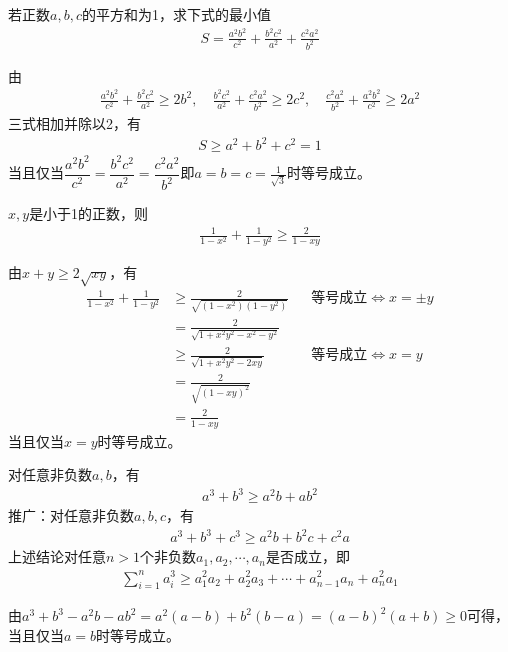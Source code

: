 \begin{example}
  若正数$a,b,c$的平方和为1，求下式的最小值
  \begin{align*}
    S=\frac{a^2b^2}{c^2} + \frac{b^2c^2}{a^2} + \frac{c^2a^2}{b^2}
  \end{align*}
\end{example}

由
\begin{align*}
  \frac{a^2b^2}{c^2} + \frac{b^2c^2}{a^2}\ge 2b^2,\quad
  \frac{b^2c^2}{a^2} + \frac{c^2a^2}{b^2}\ge 2c^2,\quad
  \frac{c^2a^2}{b^2} + \frac{a^2b^2}{c^2}\ge 2a^2
\end{align*}
三式相加并除以2，有
\begin{align*}
  S\ge a^2+b^2+c^2=1
\end{align*}
当且仅当$\dfrac{a^2b^2}{c^2} = \dfrac{b^2c^2}{a^2} = \dfrac{c^2a^2}{b^2}$即$a=b=c=\frac1{\sqrt3}$时等号成立。


\begin{example}
  $x,y$是小于1的正数，则
  \begin{align*}
    \frac1{1-x^2} + \frac1{1-y^2} \ge \frac2{1-xy}
  \end{align*}
\end{example}
由$x+y\ge2\sqrt{xy}$，有
\begin{align*}
  \frac1{1-x^2} + \frac1{1-y^2} &\ge \frac2{\sqrt{(1-x^2)(1-y^2)}} &&\text{等号成立}\iff x=\pm y\\
  &=\frac2{\sqrt{1+x^2y^2-x^2-y^2}} \\
  &\ge \frac2{\sqrt{1+x^2y^2-2xy}} &&\text{等号成立}\iff x=y\\
  &=\frac2{\sqrt{(1-xy)^2}} \\
  &=\frac2{1-xy}
\end{align*}
当且仅当$x=y$时等号成立。

\begin{example}
  对任意非负数$a,b$，有
  \begin{align*}
    a^3+b^3\ge a^2b+ab^2
  \end{align*}
  推广：对任意非负数$a,b,c$，有
  \begin{align*}
    a^3+b^3+c^3\ge a^2b+b^2c+c^2a
  \end{align*}
  上述结论对任意$n>1$个非负数$a_1,a_2,\cdots,a_n$是否成立，即
  \begin{align*}
    \sum_{i=1}^n a_i^3\ge a_1^2a_2 + a_2^2a_3 + \cdots + a_{n-1}^2a_n + a_n^2a_1
  \end{align*}
\end{example}
由$a^3+b^3-a^2b-ab^2=a^2(a-b)+b^2(b-a)=(a-b)^2(a+b)\ge0$可得，当且仅当$a=b$时等号成立。

